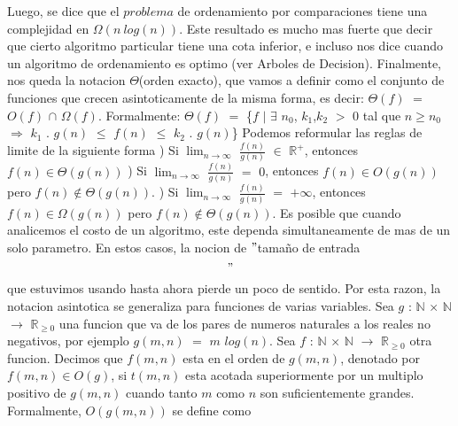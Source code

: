 \documentclass[10pt,a4paper]{article}
\begin{document}
\newline
Luego, se dice que el $problema$ de ordenamiento por comparaciones tiene una complejidad en $\Omega(n ~ log(n))$. Este resultado es mucho mas fuerte que decir que cierto algoritmo particular tiene una cota inferior, e incluso nos dice cuando un algoritmo de ordenamiento es optimo (ver Arboles de Decision).
\newline
\newline
Finalmente, nos queda la notacion $\Theta$(orden exacto), que vamos a definir como el conjunto de funciones que crecen asintoticamente de la misma forma, es decir: $\Theta(f)$ $=$ $O(f)$ $\cap$ $\Omega(f)$. Formalmente:
\newline
\newline
$\Theta(f)$ $=$ \{$f$ $|$ $\exists$ $n_{0}$, $k_{1}$,$k_{2}$ $>$ $0$ tal que $n \geq n_{0}$ $\Rightarrow$ $k_{1}$ . $g(n)$ $\leq$ $f(n)$ $\leq$ $k_{2}$ . $g(n)$\}
\newline
\newline
Podemos reformular las reglas de limite de la siguiente forma
\newline
{}) Si $\displaystyle \lim_{n \to \infty}$ $\displaystyle \frac{f(n)}{g(n)}$ $\in$ $\mathbb{R}^{+}$, entonces $f(n) \in \Theta(g(n))$ 
\newline
{}) Si $\displaystyle \lim_{n \to \infty}$ $\displaystyle \frac{f(n)}{g(n)}$ $=$ $0$, entonces $f(n) \in O(g(n))$ pero $f(n) \notin \Theta(g(n))$. 
\newline
{}) Si $\displaystyle \lim_{n \to \infty}$ $\displaystyle \frac{f(n)}{g(n)}$ $=$ $+ \infty$, entonces $f(n) \in \Omega(g(n))$ pero $f(n) \notin \Theta(g(n))$. 
\newline
\newline
Es posible que cuando analicemos el costo de un algoritmo, este dependa simultaneamente de mas de un solo parametro. En estos casos, la nocion de $"$tamaño de entrada$$"$$ que estuvimos usando hasta ahora pierde un poco de sentido. Por esta razon, la notacion asintotica se generaliza para funciones de varias variables. Sea $g$ : $\mathbb{N}$ $\times$ $\mathbb{N}$ $\to$ $\mathbb{R}_{\geq 0}$ una funcion que va de los pares de numeros naturales a los reales no negativos, por ejemplo $g(m,n)$ $=$ $m$ $log(n)$. Sea $f$ : $\mathbb{N}$ $\times$ $\mathbb{N}$ $\to$ $\mathbb{R}_{\geq 0}$ otra funcion. Decimos que
$f(m,n)$ esta en el orden de $g(m,n)$, denotado por $f(m,n) \in O(g)$, si $t(m,n)$ esta acotada superiormente por un multiplo positivo de $g(m,n)$ cuando tanto $m$ como $n$ son suficientemente grandes. Formalmente, $O(g(m,n))$ se define como
\end{document}
